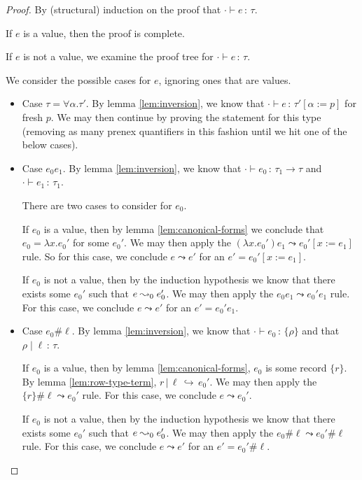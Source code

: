 \documentclass{article}
\newcommand{\hastp}[3]{#1 \vdash #2 \,:\, #3}
\newcommand{\haslbl}[3]{#1\;|\;#2\,:\, #3}
\newcommand{\haslbltm}[3]{#1\,|\,#2\,\hookrightarrow\, #3}
\newcommand{\step}[2]{#1 \leadsto #2}
\begin{document}
\begin{proof}
By (structural) induction on the proof that $\hastp{\cdot}{e}{\tau}$.

If \(e\) is a value, then the proof is complete.

If \(e\) is not a value, we examine the proof tree for \(\hastp \cdot e \tau\).

We consider the possible cases for \(e\), ignoring ones that are values.

\begin{itemize}
\item Case \(\tau = \forall \alpha. \tau'\). By lemma \ref{lem:inversion}, we
  know that \(\hastp \cdot e {\tau'[\alpha := p]}\) for fresh \(p\). We may then
  continue by proving the statement for this type (removing as many prenex
  quantifiers in this fashion until we hit one of the below cases).
\item Case \(e_0 e_1\).
    By lemma \ref{lem:inversion}, we know that \(\hastp \cdot {e_0} {\tau_1 \to
    \tau}\) and \(\hastp \cdot {e_1} \tau_1\).

    There are two cases to consider for \(e_0\).

    If \(e_0\) is a value, then by lemma \ref{lem:canonical-forms} we conclude
    that \(e_0 = \lambda x. e_0'\) for some \(e_0'\). We may then apply the
    \(\step {(\lambda x.e_0') e_1} {e_0'[x:=e_1]}\) rule. So for this case, we
    conclude \(\step e {e'}\) for an \(e' = e_0'[x:=e_1]\).

    If \(e_0\) is not a value, then by the induction hypothesis we know that
    there exists some \(e_0'\) such that \(\step e_0 {e_0'}\). We may then apply
    the \(\step {e_0 e_1}{e_0' e_1}\) rule. For this case, we conclude \(\step e
    {e'}\) for an \(e' = e_0' e_1\).

  \item Case \(e_0 \# \ell\). By lemma \ref{lem:inversion}, we know that
    \(\hastp \cdot {e_0} {\{\rho\}}\) and that \(\haslbl \rho \ell \tau\).

    If \(e_0\) is a value, then by lemma \ref{lem:canonical-forms}, \(e_0\) is
    some record \(\{r\}\). By lemma \ref{lem:row-type-term}, \(\haslbltm r \ell
    {e_0'}\). We may then apply the \(\step {\{r\} \# \ell} {e_0'}\) rule. For this
    case, we conclude \(\step e {e_0'}\).

    If \(e_0\) is not a value, then by the induction hypothesis we know that
    there exists some \(e_0'\) such that \(\step e_0 {e_0'}\). We may then apply
    the \(\step {e_0 \# \ell}{e_0' \# \ell}\) rule. For this case, we conclude
    \(\step e {e'}\) for an \(e' = e_0' \# \ell\).


\end{itemize}
\end{proof}
\end{document}
